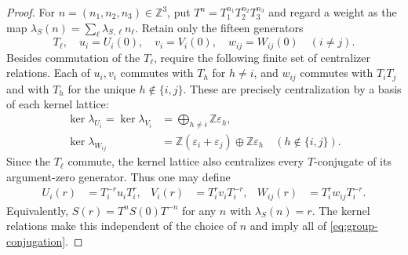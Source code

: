 \documentclass[11pt]{article}
\numberwithin{equation}{section}
\theoremstyle{definition}
\theoremstyle{remark}
\newcommand{\Z}{\mathbb Z}
\begin{document}
\begin{proof}
For $n=(n_1,n_2,n_3)\in\Z^3$, put
$T^n=T_1^{n_1}T_2^{n_2}T_3^{n_3}$ and regard a weight as the map
$\lambda_S(n)=\sum_\ell\lambda_{S,\ell}n_\ell$.  Retain only the
fifteen generators
\[
  T_\ell,\quad u_i=U_i(0),\quad v_i=V_i(0),\quad
  w_{ij}=W_{ij}(0)\quad(i\neq j).
\]
Besides commutation of the $T_\ell$, require the following finite
set of centralizer relations.  Each of $u_i,v_i$ commutes with
$T_h$ for $h\neq i$, and $w_{ij}$ commutes with $T_iT_j$ and with
$T_h$ for the unique $h\notin\{i,j\}$.  These are precisely
centralization by a basis of each kernel lattice:
\[
\begin{aligned}
 \ker\lambda_{U_i}=\ker\lambda_{V_i}
   &=\bigoplus_{h\neq i}\Z\varepsilon_h,\\
 \ker\lambda_{W_{ij}}
   &=\Z(\varepsilon_i+\varepsilon_j)
     \oplus\Z\varepsilon_h
       \quad(h\notin\{i,j\}).
\end{aligned}
\]
Since the $T_\ell$ commute, the kernel lattice also centralizes
every $T$-conjugate of its argument-zero generator.  Thus one may define
\begin{equation}
\begin{aligned}
  U_i(r)&=T_i^{-r}u_iT_i^r,&
  V_i(r)&=T_i^rv_iT_i^{-r},&
  W_{ij}(r)&=T_i^rw_{ij}T_i^{-r}.
\end{aligned}
\label{eq:group-finite-generators}
\end{equation}
Equivalently, $S(r)=T^nS(0)T^{-n}$ for any $n$ with
$\lambda_S(n)=r$.  The kernel relations make this independent of
the choice of $n$ and imply all of \eqref{eq:group-conjugation}.


\end{proof}
\end{document}
